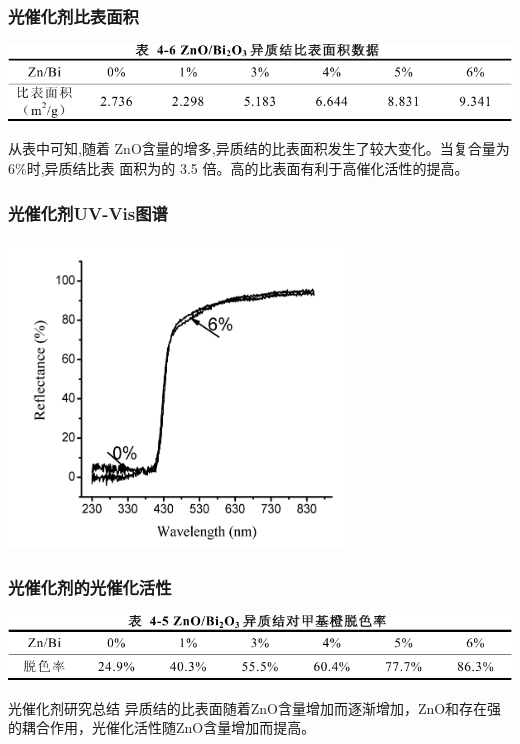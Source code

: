 \documentclass[xetex,compress]{mybeamer}
\begin{document}
\begin{frame}
\frametitle{光催化剂比表面积}
\begin{block}{}
\centering
\includegraphics[width=\linewidth]{figures/氧化锌比表面积} 
\end{block}
\begin{block}{}
从表中可知,随着 ZnO含量的增多,异质结的比表面积发生了较大变化。当复合量为 6\%时,异质结比表
面积为的 3.5 倍。高的比表面有利于高催化活性的提高。
\end{block}
\end{frame}


\begin{frame}
\frametitle{光催化剂UV-Vis图谱}
\begin{block}{}
\centering
\includegraphics[width=0.68\textwidth]{figures/氧化锌UV} 
\end{block}
\end{frame}


\begin{frame}
\frametitle{光催化剂的光催化活性}
\begin{block}{}
\centering
\includegraphics[width=\textwidth]{figures/氧化锌脱色率} 
\end{block}
\begin{block}{光催化剂研究总结}
异质结的比表面随着ZnO含量增加而逐渐增加，ZnO和存在强的耦合作用，光催化活性随ZnO含量增加而提高。
\end{block}
\end{frame}
\end{document}
